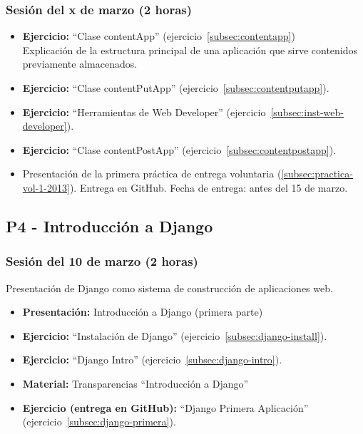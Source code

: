 \documentclass[a4paper,12pt]{article}
\begin{document}
\subsubsection{Sesión del x de marzo (2 horas)}


\begin{itemize}

 \item \textbf{Ejercicio:}  ``Clase contentApp'' (ejercicio~\ref{subsec:contentapp}) \\
   Explicación de la estructura principal de una aplicación que sirve contenidos previamente almacenados.
 \item \textbf{Ejercicio:} ``Clase contentPutApp'' (ejercicio~\ref{subsec:contentputapp}).
  \item \textbf{Ejercicio:} ``Herramientas de Web Developer'' (ejercicio~\ref{subsec:inst-web-developer}).
 \item \textbf{Ejercicio:} ``Clase contentPostApp'' (ejercicio~\ref{subsec:contentpostapp}).
  \item Presentación de la primera práctica de entrega voluntaria (\ref{subsec:practica-vol-1-2013}). Entrega en GitHub. Fecha de entrega: antes del 15 de marzo.

\end{itemize}



\subsection{P4 - Introducción a Django}

\subsubsection{Sesión del 10 de marzo (2 horas)}

Presentación de Django como sistema de construcción de aplicaciones web.

\begin{itemize}
 \item \textbf{Presentación:} Introducción a Django (primera parte)
 \item \textbf{Ejercicio:} ``Instalación de Django'' (ejercicio~\ref{subsec:django-install}).
 \item \textbf{Ejercicio:} ``Django Intro'' (ejercicio~\ref{subsec:django-intro}).
 \item \textbf{Material:} Transparencias ``Introducción a Django''
 \item \textbf{Ejercicio (entrega en GitHub):} ``Django Primera Aplicación'' (ejercicio~\ref{subsec:django-primera}).
\end{itemize}
\end{document}
